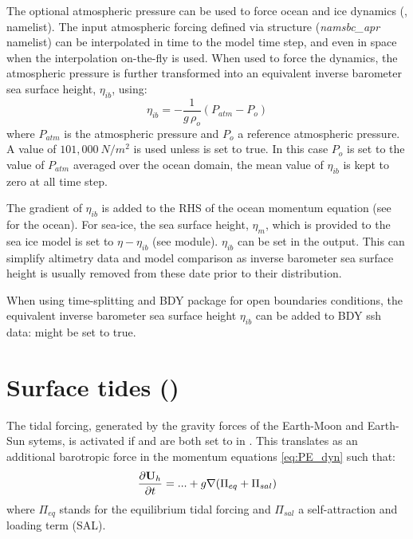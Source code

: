 \documentclass[../main/NEMO_manual]{subfiles}
\begin{document}
The optional atmospheric pressure can be used to force ocean and ice dynamics
(, \textit{} namelist).
The input atmospheric forcing defined via  structure (\textit{namsbc\_apr} namelist)
can be interpolated in time to the model time step, and even in space when the interpolation on-the-fly is used.
When used to force the dynamics, the atmospheric pressure is further transformed into
an equivalent inverse barometer sea surface height, $\eta_{ib}$, using:
\[
  \eta_{ib} = -  \frac{1}{g\,\rho_o}  \left( P_{atm} - P_o \right)
\]
where $P_{atm}$ is the atmospheric pressure and $P_o$ a reference atmospheric pressure.
A value of $101,000~N/m^2$ is used unless  is set to true.
In this case $P_o$ is set to the value of $P_{atm}$ averaged over the ocean domain,
\ie the mean value of $\eta_{ib}$ is kept to zero at all time step.

The gradient of $\eta_{ib}$ is added to the RHS of the ocean momentum equation (see  for the ocean).
For sea-ice, the sea surface height, $\eta_m$, which is provided to the sea ice model is set to $\eta - \eta_{ib}$
(see  module).
$\eta_{ib}$ can be set in the output.
This can simplify altimetry data and model comparison as
inverse barometer sea surface height is usually removed from these date prior to their distribution.

When using time-splitting and BDY package for open boundaries conditions,
the equivalent inverse barometer sea surface height $\eta_{ib}$ can be added to BDY ssh data: 
  might be set to true.

\section{Surface tides (\protect{})}
\label{sec:SBC_tide}



The tidal forcing, generated by the gravity forces of the Earth-Moon and Earth-Sun sytems,
is activated if  and  are both set to  in .
This translates as an additional barotropic force in the momentum equations \ref{eq:PE_dyn} such that:
\[
  \frac{\partial {\rm {\bf U}}_h }{\partial t}= ...
  +g\nabla (\Pi_{eq} + \Pi_{sal})
\]
where $\Pi_{eq}$ stands for the equilibrium tidal forcing and $\Pi_{sal}$ a self-attraction and loading term (SAL). 
 
\end{document}
